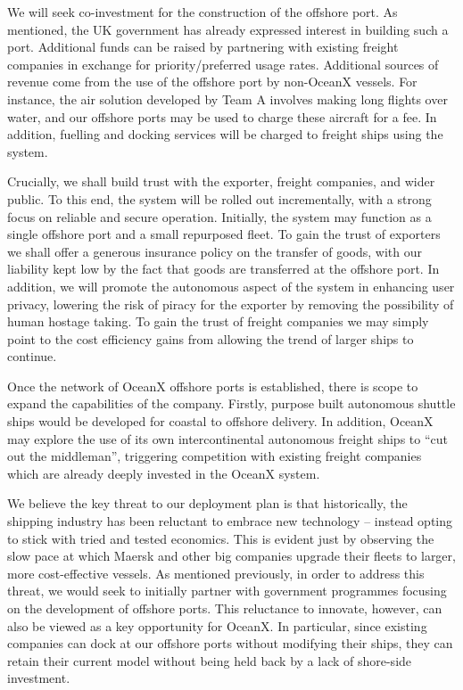 We will seek co-investment for the construction of the offshore port. As mentioned, the UK government has already expressed interest in building such a port. Additional funds can be raised by partnering with existing freight companies in exchange for priority/preferred usage rates. Additional sources of revenue come from the use of the offshore port by non-OceanX vessels. For instance, the air solution developed by Team A involves making long flights over water, and our offshore ports may be used to charge these aircraft for a fee. In addition, fuelling and docking services will be charged to freight ships using the system.

Crucially, we shall build trust with the exporter, freight companies, and wider public. To this end, the system will be rolled out incrementally, with a strong focus on reliable and secure operation. Initially, the system may function as a single offshore port and a small repurposed fleet. To gain the trust of exporters we shall offer a generous insurance policy on the transfer of goods, with our liability kept low by the fact that goods are transferred at the offshore port. In addition, we will promote the autonomous aspect of the system in enhancing user privacy, lowering the risk of piracy for the exporter by removing the possibility of human hostage taking. To gain the trust of freight companies we may simply point to the cost efficiency gains from allowing the trend of larger ships to continue.

Once the network of OceanX offshore ports is established, there is scope to expand the capabilities of the company. Firstly, purpose built autonomous shuttle ships would be developed for coastal to offshore delivery. In addition, OceanX may explore the use of its own intercontinental autonomous freight ships to “cut out the middleman”, triggering competition with existing freight companies which are already deeply invested in the OceanX system.

We believe the key threat to our deployment plan is that historically, the shipping industry has been reluctant to embrace new technology -- instead opting to stick with tried and tested economics. This is evident just by observing the slow pace at which Maersk and other big companies upgrade their fleets to larger, more cost-effective vessels. As mentioned previously, in order to address this threat, we would seek to initially partner with government programmes focusing on the development of offshore ports. This reluctance to innovate, however, can also be viewed as a key opportunity for OceanX. In particular, since existing companies can dock at our offshore ports without modifying their ships, they can retain their current model without being held back by a lack of shore-side investment.


